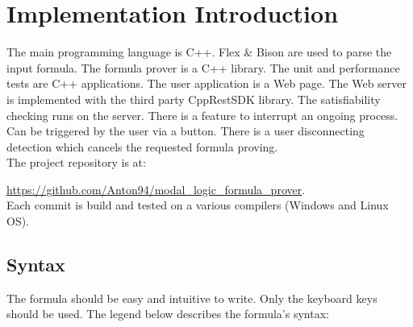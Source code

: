 \documentclass{article}
\begin{document}
	\newpage
	\section{Implementation Introduction}
	The main programming language is C++. Flex \& Bison are used to parse the input formula. The formula prover is a C++ library. The unit and performance tests are C++ applications.
	The user application is a Web page. The Web server is implemented with the third party CppRestSDK library. The satisfiability checking runs on the server. There is a feature to interrupt an ongoing process. Can be triggered by the user via a button. There is a user disconnecting detection which cancels the requested formula proving. \\
	The project repository is at:

	\url{https://github.com/Anton94/modal_logic_formula_prover}. \\
	Each commit is build and tested on a various compilers (Windows and Linux OS).
		
	\subsection{Syntax}
	The formula should be easy and intuitive to write. Only the keyboard keys should be used. The legend below describes the formula's syntax:
\end{document}
